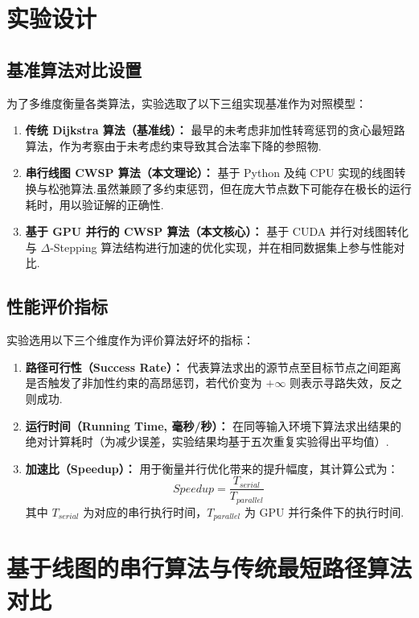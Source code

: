 \section{实验设计}

\subsection{基准算法对比设置}
为了多维度衡量各类算法，实验选取了以下三组实现基准作为对照模型：
\begin{enumerate}
    \item \textbf{传统 Dijkstra 算法（基准线）：} 最早的未考虑非加性转弯惩罚的贪心最短路算法，作为考察由于未考虑约束导致其合法率下降的参照物.
    \item \textbf{串行线图 CWSP 算法（本文理论）：} 基于 Python 及纯 CPU 实现的线图转换与松弛算法.虽然兼顾了多约束惩罚，但在庞大节点数下可能存在极长的运行耗时，用以验证解的正确性.
    \item \textbf{基于 GPU 并行的 CWSP 算法（本文核心）：} 基于 CUDA 并行对线图转化与 $\Delta$-Stepping 算法结构进行加速的优化实现，并在相同数据集上参与性能对比.
\end{enumerate}

\subsection{性能评价指标}
实验选用以下三个维度作为评价算法好坏的指标：
\begin{enumerate}
    \item \textbf{路径可行性（Success Rate）：} 代表算法求出的源节点至目标节点之间距离是否触发了非加性约束的高昂惩罚，若代价变为 $+\infty$ 则表示寻路失效，反之则成功.
    \item \textbf{运行时间（Running Time, 毫秒/秒）：} 在同等输入环境下算法求出结果的绝对计算耗时（为减少误差，实验结果均基于五次重复实验得出平均值）.
    \item \textbf{加速比（Speedup）：} 用于衡量并行优化带来的提升幅度，其计算公式为：$$ Speedup = \frac{T_{serial}}{T_{parallel}} $$ 其中 $T_{serial}$ 为对应的串行执行时间，$T_{parallel}$ 为 GPU 并行条件下的执行时间.
\end{enumerate}





\section{基于线图的串行算法与传统最短路径算法对比}

